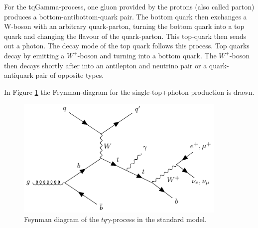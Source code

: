For the tqGamma-process, one gluon provided by the protons (also called parton) produces a bottom-antibottom-quark pair. The bottom quark then exchanges a W-boson with an arbitrary quark-parton, turning the bottom quark into a top quark and changing the flavour of the quark-parton. This top-quark then sends out a photon. 
The decay mode of the top quark follows this process. Top quarks decay by emitting a $W^+$-boson and turning into a bottom quark. The $W^+$-boson then decays shortly after into an antilepton and neutrino pair or a quark-antiquark pair of opposite types.

In Figure \ref{fig:feyn_tqGamma} the Feynman-diagram for the single-top+photon production is drawn. 
\begin{figure}
    \centering
    \includegraphics[width=0.9\textwidth]{Plots/s4_feyn_nom.pdf}
    \caption{Feynman diagram of the $tq\gamma$-process in the standard model.}
    \label{fig:feyn_tqGamma}
\end{figure}